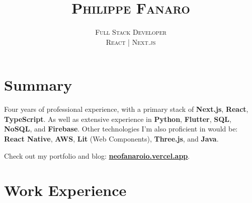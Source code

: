 \documentclass[14pt]{extarticle}
\title{\scshape \huge \vspace{-1.5cm} Philippe Fanaro\\[0.2cm]}
\author{%
  \scshape \Large Full Stack Developer%
  \\[0.5cm]%
  \scshape \fontsize{19pt}{22pt}\selectfont React | Next.js%
  \vspace{0.6cm}%
}
\date{}
\renewcommand{\_}{\leavevmode\kern.06em\vbox{\hrule width.425em}}
\newenvironment{cssquote}{%
  \begin{mdframed}[style=CSSquote]
}{%
  \end{mdframed}
}
\begin{document}
\maketitle

\section{Summary}

Four years of professional experience, with a primary stack of \textbf{Next.js}, \textbf{React}, \textbf{TypeScript}. As well as extensive experience in \textbf{Python}, \textbf{Flutter}, \textbf{SQL}, \textbf{NoSQL}, and \textbf{Firebase}. Other technologies I'm also proficient in would be: \textbf{React Native}, \textbf{AWS}, \textbf{Lit} (Web Components), \textbf{Three.js}, and \textbf{Java}.

\vspace{0.4cm}

\begin{cssquote}
Check out my portfolio and blog: \textbf{\href{https://neofanaroio.vercel.app}{neofanaroio.vercel.app}}.
\end{cssquote}

\section{Work Experience}
\end{document}
